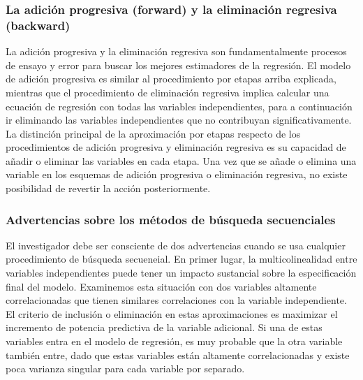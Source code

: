 \documentclass[
  12pt,
]{krantz}
\theoremstyle{definition}
\theoremstyle{definition}
\theoremstyle{definition}
\theoremstyle{remark}
\begin{document}
\hypertarget{la-adicion-progresiva-forward-y-la-eliminacion-regresiva-backward}{%
\subsubsection{La adición progresiva (forward) y la eliminación regresiva (backward)}\label{la-adicion-progresiva-forward-y-la-eliminacion-regresiva-backward}}

La adición progresiva y la eliminación regresiva son fundamentalmente procesos de ensayo y error para buscar los mejores estimadores de la regresión. El modelo de adición progresiva es similar al procedimiento por etapas arriba explicada, mientras que el procedimiento de eliminación regresiva implica calcular una ecuación de regresión con todas las variables independientes, para a continuación ir eliminando las variables independientes que no contribuyan significativamente. La distinción principal de la aproximación por etapas respecto de los procedimientos de adición progresiva y eliminación regresiva es su capacidad de añadir o eliminar las variables en cada etapa. Una vez que se añade o elimina una variable en los esquemas de adición progresiva o eliminación regresiva, no existe posibilidad de revertir la acción posteriormente.

\hypertarget{advertencias-sobre-los-metodos-de-busqueda-secuenciales}{%
\subsubsection{Advertencias sobre los métodos de búsqueda secuenciales}\label{advertencias-sobre-los-metodos-de-busqueda-secuenciales}}

El investigador debe ser consciente de dos advertencias cuando se usa cualquier procedimiento de búsqueda secueneial. En primer lugar, la multicolinealidad entre variables independientes puede tener un impacto sustancial sobre la especificación final del modelo. Examinemos esta situación con dos variables altamente correlacionadas que tienen similares correlaciones con la variable independiente. El criterio de inclusión o eliminación en estas aproximaciones es maximizar el incremento de potencia predictiva de la variable adicional. Si una de estas variables entra en el modelo de regresión, es muy probable que la otra variable también entre, dado que estas variables están altamente correlacionadas y existe poca varianza singular para cada variable por separado.
\end{document}
